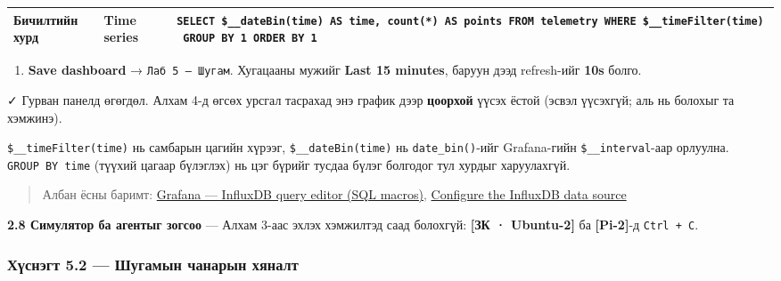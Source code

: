 \begin{longtable}[]{@{}lll@{}}
\begin{minipage}[t]{0.30\columnwidth}\raggedright
Бичилтийн хурд\strut
\end{minipage} & \begin{minipage}[t]{0.30\columnwidth}\raggedright
Time series\strut
\end{minipage} & \begin{minipage}[t]{0.30\columnwidth}\raggedright
\texttt{SELECT\ \$\_\allowbreak{}\_\allowbreak{}dateBin(time)\ AS\ time,\ count(*)\ AS\ points\ FROM\ telemetry\ WHERE\ \$\_\allowbreak{}\_\allowbreak{}timeFilter(time)\ GROUP\ BY\ 1\ ORDER\ BY\ 1}\strut
\end{minipage}\tabularnewline
\bottomrule
\end{longtable}\endgroup

\begin{enumerate}
\def\labelenumi{\arabic{enumi}.}
\setcounter{enumi}{3}
\tightlist
\item
  \textbf{Save dashboard} → \texttt{Лаб\ 5\ —\ Шугам}. Хугацааны мужийг \textbf{Last 15 minutes}, баруун дээд refresh-ийг \textbf{10s} болго.
\end{enumerate}

✓ Гурван панелд өгөгдөл. Алхам 4-д өгсөх урсгал тасрахад энэ график дээр \textbf{цоорхой} үүсэх ёстой (эсвэл үүсэхгүй; аль нь болохыг та хэмжинэ).

\texttt{\$\_\allowbreak{}\_\allowbreak{}timeFilter(time)} нь самбарын цагийн хүрээг, \texttt{\$\_\allowbreak{}\_\allowbreak{}dateBin(time)} нь \texttt{date\_bin()}-ийг Grafana-гийн \texttt{\$\_\allowbreak{}\_\allowbreak{}interval}-аар орлуулна. \texttt{GROUP\ BY\ time} (түүхий цагаар бүлэглэх) нь цэг бүрийг тусдаа бүлэг болгодог тул хурдыг харуулахгүй.

\begin{quote}
Албан ёсны баримт: \href{https://grafana.com/docs/grafana/latest/datasources/influxdb/query-editor/}{Grafana --- InfluxDB query editor (SQL macros)}, \href{https://grafana.com/docs/grafana/latest/datasources/influxdb/configure/}{Configure the InfluxDB data source}
\end{quote}

\textbf{2.8 Симулятор ба агентыг зогсоо} --- Алхам 3-аас эхлэх хэмжилтэд саад болохгүй: \textbf{{[}ЗК · Ubuntu-2{]}} ба \textbf{{[}Pi-2{]}}-д \texttt{Ctrl\ +\ C}.

\hypertarget{ux445ux4afux441ux43dux44dux433ux442-5.2-ux448ux443ux433ux430ux43cux44bux43d-ux447ux430ux43dux430ux440ux44bux43d-ux445ux44fux43dux430ux43bux442}{%
\subsubsection{Хүснэгт 5.2 --- Шугамын чанарын хяналт}\label{ux445ux4afux441ux43dux44dux433ux442-5.2-ux448ux443ux433ux430ux43cux44bux43d-ux447ux430ux43dux430ux440ux44bux43d-ux445ux44fux43dux430ux43bux442}}

